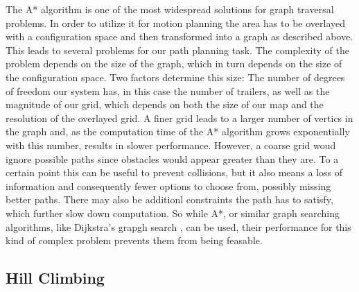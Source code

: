 The A* algorithm is one of the most widespread solutions for graph traversal problems.\cite{8} In order to utilize it for motion planning the area has to be overlayed with a configuration space and then transformed into a graph as described above. This leads to several problems for our path planning task. The complexity of the problem depends on the size of the graph, which in turn depends on the size of the configuration space. Two factors determine this size: The number of degrees of freedom our system has, in this case the number of trailers, as well as the magnitude of our grid, which depends on both the size of our map and the resolution of the overlayed grid. A finer grid leads to a larger number of vertics in the graph and, as the computation time of the A* algorithm grows exponentially with this number, results in slower performance. However, a coarse grid woud ignore possible paths since obstacles would appear greater than they are. To a certain point this can be useful to prevent collisions, but it also means a loss of information and consequently fewer options to choose from, possibly missing better paths. There may also be additionl constraints the path has to satisfy, which further slow down computation. So while A*, or similar graph searching algorithms, like Dijkstra's grapgh search \cite{6}, can be used, their performance for this kind of complex problem prevents them from being feasable.

\subsection{Hill Climbing}
\label{sec:hill_climbing}

